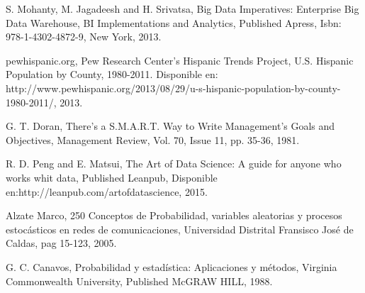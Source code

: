 \documentclass[conference]{IEEEtran}\usepackage[]{graphicx}\usepackage[]{color}
\begin{document}
	
	
	\newpage
	 \begin{thebibliography}{1}
	 	
	 	S. Mohanty, M. Jagadeesh and H. Srivatsa, Big Data Imperatives: Enterprise Big Data Warehouse, BI Implementations and Analytics, Published Apress, Isbn: 978-1-4302-4872-9, New York, 2013.
	 	
	 	pewhispanic.org, Pew Research Center’s Hispanic Trends Project, U.S. Hispanic Population by County, 1980-2011. Disponible en: http://www.pewhispanic.org/2013/08/29/u-s-hispanic-population-by-county-1980-2011/, 2013.
	 	 	
	 	G. T. Doran, There's a S.M.A.R.T. Way to Write Management's Goals and Objectives, Management Review, Vol. 70, Issue 11, pp. 35-36, 1981.
	 	
	 	R. D. Peng and E. Matsui, The Art of Data Science: A guide for anyone who works whit data, Published Leanpub, Disponible en:http://leanpub.com/artofdatascience, 2015.
	 	 	
	 	Alzate Marco, 250 Conceptos de Probabilidad, variables aleatorias y procesos estocásticos en redes de comunicaciones, Universidad Distrital Fransisco José de Caldas, pag 15-123, 2005.
	 	
 		G. C. Canavos, Probabilidad y estadística: Aplicaciones y métodos, Virginia Commonwealth University, Published McGRAW HILL, 1988.
	 	
	 \end{thebibliography}
	
\end{document}
